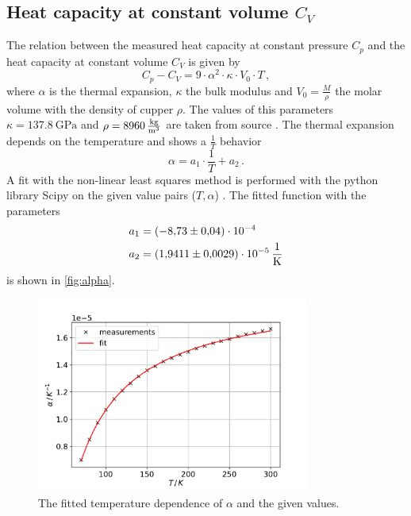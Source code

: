 \subsection{Heat capacity at constant volume $C_V$}
The relation between the measured heat capacity at constant pressure $C_p$ and the heat capacity at constant volume $C_V$ is given by  %
\begin{equation}
        C_p - C_V = 9 \cdot \alpha^2 \cdot \kappa \cdot V_0 \cdot T \, ,
        \label{eqn:C_relation}
\end{equation}
where $\alpha$ is the thermal expansion, $\kappa$ the bulk modulus and $V_0 = \frac{M}{\rho}$ the molar volume with the density of cupper $\rho$.
The values of this parameters $\kappa = \qty{137.8}{\giga\pascal}$ and $\rho = \qty{8960}{\frac{\kilogram}{\metre^3}}$ are taken from source \cite{goodfellow}.
The thermal expansion depends on the temperature and shows a $\frac{1}{T}$ behavior
\begin{equation}
    \alpha = a_1 \cdot \frac{1}{T} + a_2 \, .
\end{equation}
A fit with the non-linear least squares method is performed with the python library Scipy\cite{scipy} on the given value pairs ($T, \alpha$) \cite{V47}.
The fitted function with the parameters
\begin{align*}
    a_1 &= \qty{-8.73(4)e-04}{} \\
    a_2 &= \qty{1.9411(29)e-05}{\frac{1}{\kelvin}}
\end{align*}
is shown in \autoref{fig:alpha}.
\begin{figure}
    \centering
    \includegraphics[width=0.8\textwidth]{content/plots/temperature_progress.pdf}
    \caption{The fitted temperature dependence of $\alpha$ and the given values.}
    \label{fig:alpha}
\end{figure}
